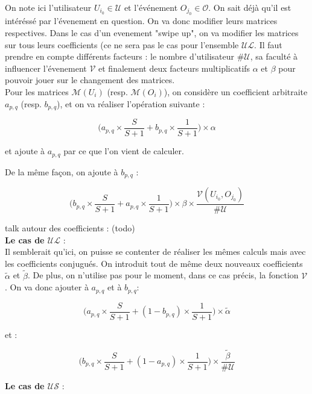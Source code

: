 \documentclass[11pt, oneside]{article}
\begin{document}
On note ici l'utilisateur $U_{i_0} \in \mathcal{U}$ et l'événement $O_{j_0} \in \mathcal{O}$. On sait déjà qu'il est intéréssé par l'évenement en question. On va donc modifier leurs matrices respectives. Dans le cas d'un evenement "swipe up", on va modifier les matrices sur tous leurs coefficients (ce ne sera pas le cas pour l'ensemble $\mathcal{UL}$. Il faut prendre en compte différents facteurs : le nombre d'utilisateur $\#\mathcal{U}$, sa faculté à influencer l'évenement $\mathcal{V}$ et finalement deux facteurs multiplicatifs $\alpha$ et $\beta$ pour pouvoir jouer sur le changement des matrices. \\

Pour les matrices $\mathcal{M} (U_i)$ (resp. $\mathcal{M} (O_i)$), on considère un coefficient arbitraite $a_{p,q}$ (resp. $b_{p,q}$), et on va réaliser l'opération suivante :
\begin{center}
\[
 \big( a_{p,q} \times \frac{S}{S+1} + b_{p,q}\times \frac{1}{S+1} \big) \times \alpha
\]
\end{center}
et ajoute à $a_{p,q}$ par ce que l'on vient de calculer.

De la même façon, on ajoute à $b_{p,q}$ :
\begin{center}
\[
 \big( b_{p,q} \times \frac{S}{S+1} + a_{p,q}\times \frac{1}{S+1} \big) \times \beta \times \frac{\mathcal{V}(U_{i_0},O_{j_0})}{\#\mathcal{U}}
\]
\end{center}

talk autour des coefficients : (todo) \\
\newpage
\textbf{Le cas de $\mathcal{UL}$} : \\

Il semblerait qu'ici, on puisse se contenter de réaliser les mêmes calculs mais avec les coefficients conjugués. On introduit tout de même deux nouveaux coefficients $\tilde{\alpha}$ et $\tilde{\beta}$. De plus, on n'utilise pas pour le moment, dans ce cas précis, la fonction $\mathcal{V}$. On va donc ajouter à $a_{p,q}$ et à $b_{p,q}$:
\begin{center}
\[
 \big( a_{p,q} \times \frac{S}{S+1} + (1 - b_{p,q})\times \frac{1}{S+1} \big) \times\tilde{\alpha}
\]
\end{center}
et :
\begin{center}
\[
 \big( b_{p,q} \times \frac{S}{S+1} + (1 - a_{p,q})\times \frac{1}{S+1} \big) \times \frac{\mathcal{\tilde{\beta}}}{\#\mathcal{U}}
\]
\end{center}

\textbf{Le cas de $\mathcal{US}$} : \\
\end{document}
